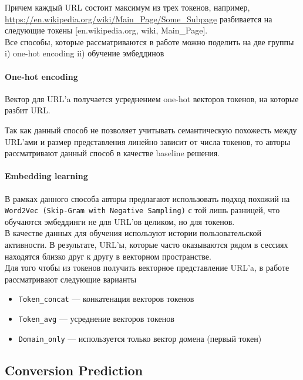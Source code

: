 Причем каждый URL состоит максимум из трех токенов, например, \url{https://en.wikipedia.org/wiki/Main_Page/Some\_Subpage} разбивается на следующие токены
  [en.wikipedia.org, wiki, Main\_Page]. \\

Все способы, которые рассматриваются в работе можно поделить на две группы i) one-hot encoding ii) обучение эмбеддинов

\paragraph{One-hot encoding} Вектор для URL'a получается усреднением one-hot векторов токенов, на которые разбит URL.

Так как данный способ не позволяет учитывать семантическую похожесть между URL'ами и размер представления линейно зависит от числа токенов, то авторы рассматривают данный способ в качестве baseline решения.

\paragraph{Embedding learning} В рамках данного способа авторы предлагают использовать подход похожий на \texttt{Word2Vec (Skip-Gram with Negative Sampling)} с той лишь разницей, что обучаются эмбеддинги не для URL'ов целиком, но для токенов. \\

В качестве данных для обучения используют истории пользовательской активности. В результате, URL'ы, которые часто оказываются рядом в сессиях находятся близко друг к другу в векторном пространстве. \\

Для того чтобы из токенов получить векторное представление URL'a, в работе рассматривают следующие варианты
\begin{itemize}
    \item \texttt{Token\_concat} --- конкатенация векторов токенов
    \item \texttt{Token\_avg} --- усреднение векторов токенов
    \item \texttt{Domain\_only} --- используется только вектор домена (первый токен)
\end{itemize}

\subsection{Conversion Prediction}

